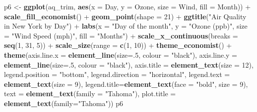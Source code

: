\documentclass[]{article}
\newenvironment{Shaded}{\begin{snugshade}}{\end{snugshade}}
\newcommand{\KeywordTok}[1]{\textcolor[rgb]{0.13,0.29,0.53}{\textbf{{#1}}}}
\newcommand{\DataTypeTok}[1]{\textcolor[rgb]{0.13,0.29,0.53}{{#1}}}
\newcommand{\DecValTok}[1]{\textcolor[rgb]{0.00,0.00,0.81}{{#1}}}
\newcommand{\StringTok}[1]{\textcolor[rgb]{0.31,0.60,0.02}{{#1}}}
\newcommand{\NormalTok}[1]{{#1}}
\begin{document}
\begin{Shaded}
\begin{Highlighting}[]
\NormalTok{p6 <-}\StringTok{ }\KeywordTok{ggplot}\NormalTok{(aq_trim, }\KeywordTok{aes}\NormalTok{(}\DataTypeTok{x =} \NormalTok{Day, }\DataTypeTok{y =} \NormalTok{Ozone, }\DataTypeTok{size =} \NormalTok{Wind, }\DataTypeTok{fill =} \NormalTok{Month)) +}
\StringTok{      }\KeywordTok{scale_fill_economist}\NormalTok{() +}
\StringTok{      }\KeywordTok{geom_point}\NormalTok{(}\DataTypeTok{shape =} \DecValTok{21}\NormalTok{) +}
\StringTok{      }\KeywordTok{ggtitle}\NormalTok{(}\StringTok{"Air Quality in New York by Day"}\NormalTok{) +}\StringTok{ }
\StringTok{      }\KeywordTok{labs}\NormalTok{(}\DataTypeTok{x =} \StringTok{"Day of the month"}\NormalTok{, }\DataTypeTok{y =} \StringTok{"Ozone (ppb)"}\NormalTok{, }\DataTypeTok{size =} \StringTok{"Wind Speed (mph)"}\NormalTok{, }\DataTypeTok{fill =} \StringTok{"Months"}\NormalTok{) +}
\StringTok{      }\KeywordTok{scale_x_continuous}\NormalTok{(}\DataTypeTok{breaks =} \KeywordTok{seq}\NormalTok{(}\DecValTok{1}\NormalTok{, }\DecValTok{31}\NormalTok{, }\DecValTok{5}\NormalTok{)) +}
\StringTok{      }\KeywordTok{scale_size}\NormalTok{(}\DataTypeTok{range =} \KeywordTok{c}\NormalTok{(}\DecValTok{1}\NormalTok{, }\DecValTok{10}\NormalTok{)) +}
\StringTok{      }\KeywordTok{theme_economist}\NormalTok{() +}\StringTok{ }
\StringTok{      }\KeywordTok{theme}\NormalTok{(}\DataTypeTok{axis.line.x =} \KeywordTok{element_line}\NormalTok{(}\DataTypeTok{size=}\NormalTok{.}\DecValTok{5}\NormalTok{, }\DataTypeTok{colour =} \StringTok{"black"}\NormalTok{), }
            \DataTypeTok{axis.line.y =} \KeywordTok{element_line}\NormalTok{(}\DataTypeTok{size=}\NormalTok{.}\DecValTok{5}\NormalTok{, }\DataTypeTok{colour =} \StringTok{"black"}\NormalTok{), }
            \DataTypeTok{axis.title =} \KeywordTok{element_text}\NormalTok{(}\DataTypeTok{size =} \DecValTok{12}\NormalTok{),}
            \DataTypeTok{legend.position =} \StringTok{"bottom"}\NormalTok{, }\DataTypeTok{legend.direction =} \StringTok{"horizontal"}\NormalTok{,}
            \DataTypeTok{legend.text =} \KeywordTok{element_text}\NormalTok{(}\DataTypeTok{size =} \DecValTok{9}\NormalTok{),}
            \DataTypeTok{legend.title=}\KeywordTok{element_text}\NormalTok{(}\DataTypeTok{face =} \StringTok{"bold"}\NormalTok{, }\DataTypeTok{size =} \DecValTok{9}\NormalTok{),}
            \DataTypeTok{text =} \KeywordTok{element_text}\NormalTok{(}\DataTypeTok{family =} \StringTok{"Tahoma"}\NormalTok{),}
            \DataTypeTok{plot.title =} \KeywordTok{element_text}\NormalTok{(}\DataTypeTok{family=}\StringTok{"Tahoma"}\NormalTok{))}
\NormalTok{p6}
\end{Highlighting}
\end{Shaded}
\end{document}
